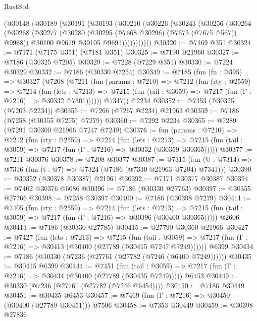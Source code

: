 \begin{lexlean}{RustStd}
\begin{coremodule}
{\begin{coremodule}
{{{{{{{{{{{{{{{{{{{{{{{{{{{{{{{{    (@30148
      (@30189
        (@30191
          (@30193
            (@30210
              (@30226
                (@30243
                  (@30256
                    (@30264
                      (@30268
                        (@30277
                          (@30280 (@30295 (@7668 @30296) (@7673 (@7675 @567)) @9968))
                          @30100
                          @9679
                          @30105
                          @9691)))))))))))
@30320 := @7169 @351
@30324 := @7171 (@7175 @351) (@7181 @351)
@30325 := @7190 @21960
@30327 := @7186 (@30325 @7205)
@30329 := @7228 (@7229 @351)
@30330 := @7224 @30329
@30332 := @7186 (@30330 @7254)
@30349 := @7185
    (fun (fn : @395) =>
    @30327
      (@7208
        (@7211
          (fun (params : @7210) =>
          @7212
            (fun (rty : @2559) =>
            @7214
              (fun (lets : @7213) =>
              @7215 (fun (tail : @3059) => @7217 (fun (Γ : @7216) => @30332 @7301))))))
        @7347))
    @2234
@30352 := @7353 (@30325 (@7203 @2234))
@30355 := @7266 (@7267 @2234) @21963
@30359 := @7186 (@7258 (@30355 @7275) @7279)
@30360 := @7292 @2234
@30365 := @7289 (@7291 @30360 @21966 @7247 @7249)
@30376 := fun (params : @7210) =>
  @7212
    (fun (rty : @2559) =>
    @7214
      (fun (lets : @7213) =>
      @7215 (fun (tail : @3059) => @7217 (fun (Γ : @7216) => @30332 (@30359 @30365)))))
@30377 := @7211 @30376
@30378 := @7208 @30377
@30387 := @7315
    (fun (U : @7314) => @7316 (fun (t : @7) => @7324 (@7186 (@7330 @21963 @7204) @7341)))
@30390 := @30352 (@30378 @30387) @21961
@30392 := @7171 @30377 @30387
@30394 := @7402 @30376 @6086
@30396 := @7186 (@30330 @27763)
@30397 := @30355 @27766
@30398 := @7258 @30397
@30400 := @7186 (@30398 @7279)
@30411 := @7405
    (fun (rty : @2559) =>
    @7214
      (fun (lets : @7213) =>
      @7215 (fun (tail : @3059) => @7217 (fun (Γ : @7216) => @30396 (@30400 @30365)))))
    @2606
@30413 := @7186 (@30330 @27785)
@30415 := @27790 @30360 @21966
@30427 := @7427
    (fun (lets : @7213) =>
    @7215
      (fun (tail : @3059) =>
      @7217 (fun (Γ : @7216) => @30413 (@30400 (@27789 (@30415 @7247 @7249))))))
    @6399
@30434 := @7186 (@30330 (@7236 (@27761 (@27782 (@7246 (@6400 @7249))))))
@30435 := @30415 @6399
@30444 := @7451
    (fun (tail : @3059) => @7217 (fun (Γ : @7216) => @30434 (@30400 (@27789 (@30435 @7249)))))
    @6453
@30449 := @30330 (@7236 (@27761 (@27782 (@7246 @6454))))
@30450 := @7186 @30449
@30451 := @30435 @6453
@30457 := @7469 (fun (Γ : @7216) => @30450 (@30400 (@27789 @30451))) @7506
@30458 := @7353 @30449
@30459 := @30398 @27836
}}}}}}}}}}}}}}}}}}}}}}}}}}}}}}}}
\end{coremodule}}
\end{coremodule}
\end{lexlean}
